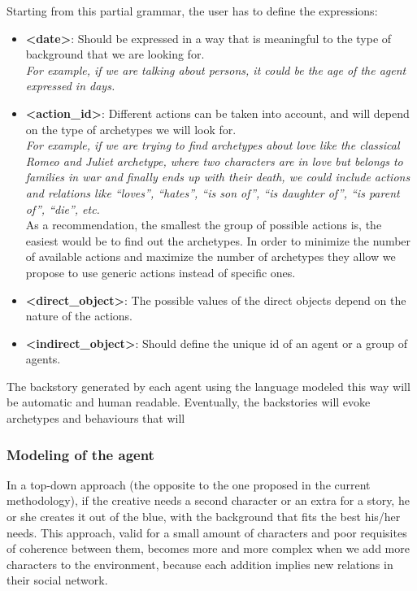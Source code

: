 \documentclass{sig-alternate}
\begin{document}
Starting from this partial grammar, the user has to define the expressions:
\begin{itemize}
\item \textbf{<date>}: Should be expressed in a way that is meaningful to the type of background that we are looking for.\\
\textit{For example, if we are talking about persons, it could be the age of the agent expressed in days.}

\item \textbf{<action\_id>}: Different actions can be taken into account, and will depend on the type of archetypes we will look for.\\

\textit{For example, if we are trying to find archetypes about love like the classical Romeo and Juliet archetype, where two characters are in love but belongs to families in war and finally ends up with their death, we could include actions and relations like ``loves'', ``hates'', ``is son of'', ``is daughter of'', ``is parent of'', ``die'', etc.}\\

As a recommendation, the smallest the group of possible actions is, the easiest would be to find out the archetypes. In order to minimize the number of available actions and maximize the number of archetypes they allow we propose to use generic actions instead of specific ones.

\item \textbf{<direct\_object>}: The possible values of the direct objects depend on the nature of the actions.

\item \textbf{<indirect\_object>}: Should define the unique id of an agent or a group of agents.

\end{itemize}

The backstory generated by each agent using the language modeled this way will be automatic and human readable. Eventually, the backstories will evoke archetypes and behaviours that will  



\subsubsection{Modeling of the agent}


In a top-down approach (the opposite to the one proposed in the current methodology), if the creative needs a second character or an extra for a story, he or she creates it out of the blue, with the background that fits the best his/her needs. This approach, valid for a small amount of characters and poor requisites of coherence between them, becomes more and more complex when we add more characters to the environment, because each addition implies new relations in their social network.
\\
\end{document}
